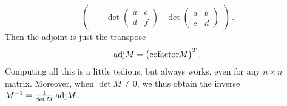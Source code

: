 {\[\begin{pmatrix}
&-\det\begin{pmatrix}a&c\\d&f\end{pmatrix}
&\det\begin{pmatrix}a&b\\c&d\end{pmatrix}
\end{pmatrix}\, .
\]
Then the adjoint is just the transpose
\[
{\rm adj}M=\big({\rm cofactor} M\big)^T\, .
\]
Computing all this is a little tedious, but always works, even for any $n\times n$ matrix.
Moreover, when $\det M \neq 0$, we thus obtain the inverse
$
M^{-1}=\frac{1}{\det M}\, {\rm adj}M
$.


}

\newpage

